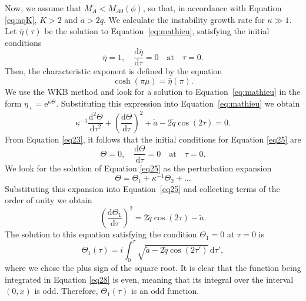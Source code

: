 \documentclass[12pt]{ociamthesis}
\begin{document}
Now, we assume that $M_A < M_{A0}(\phi)$, so that, in accordance with Equation \eqref{eq:aqK}, $K > 2$ and $a > 2q$.
We calculate the instability growth rate for $\kappa \gg 1$.
Let $\bar\eta(\tau)$ be the solution to Equation~\eqref{eq:mathieu}, satisfying the initial conditions
%
\begin{equation}
\label{eq23}
\bar\eta = 1, \quad \frac{\mathrm{d}\bar\eta}{\mathrm{d}\tau} = 0 \quad
\mbox{at} \quad \tau = 0. 
\end{equation}
%
Then, the characteristic exponent is defined by the equation \citep{Abramowitz1965}
%
\begin{equation}
\label{eq24}
\cosh(\pi\mu) = \bar\eta(\pi).
\end{equation}
%
We use the WKB method and look for a solution to Equation~\eqref{eq:mathieu} in the form  $\eta_+ = \mathrm{e}^{\kappa\Theta}$\/. Substituting this expression into Equation~\eqref{eq:mathieu} we obtain
%
\begin{equation}
\label{eq25}
\kappa^{-1}\frac{\mathrm{d}^2\Theta}{\mathrm{d}\tau^2} + 
\left(\frac{\mathrm{d}\Theta}{\mathrm{d}\tau}\right)^2 +
\tilde{a} - 2\tilde{q}\cos(2\tau) = 0. 
\end{equation}
%
From Equation \eqref{eq23}, it follows that the initial conditions for Equation \eqref{eq25} are
%
\begin{equation}
\Theta = 0, \quad \frac{\mathrm{d} \Theta}{\mathrm{d}\tau} = 0 \quad
\mbox{at} \quad \tau = 0.
\end{equation}
%
We look for the solution of Equation \eqref{eq25} as the perturbation expansion
\begin{equation}
\label{eq26}
\Theta = \Theta_1 + \kappa^{-1}\Theta_2 + \dots 
\end{equation}
%
Substituting this expansion into Equation~\eqref{eq25} and collecting terms of the order of unity we obtain
%
\begin{equation}
\label{eq27}
\left(\frac{\mathrm{d}\Theta_1}{\mathrm{d}\tau}\right)^2 =
2\tilde{q}\cos(2\tau) - \tilde{a}. 
\end{equation}
%
The solution to this equation satisfying the condition $\Theta_1 = 0$ at $\tau = 0$ is
%
\begin{equation}
\label{eq28}
\Theta_1 (\tau) = i\int_0^\tau\sqrt{\tilde{a} - 2\tilde{q}\cos(2\tau')}\,\mathrm{d}\tau',
\end{equation}
%
where we chose the plus sign of the square root.
It is clear that the function being integrated in Equation \eqref{eq28} is even, meaning that its integral over the interval $(0, x)$ is odd.
Therefore, $\Theta_1 (\tau)$ is an odd function.
\end{document}
